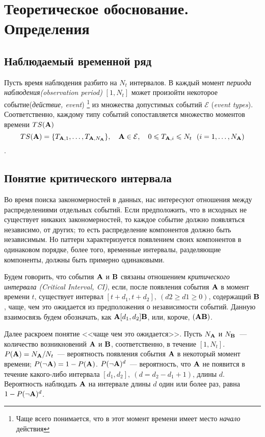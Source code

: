 \section{Теоретическое обоснование. Определения}
  \subsection{Наблюдаемый временной ряд}
Пусть время наблюдения разбито на $N_t$ интервалов. В каждый момент {\itshape периода наблюдения(observation period)} $[1,N_t]$ 
может произойти некоторое 
событие({\itshape действие, event}) \footnote{ Чаще всего понимается, что в этот момент времени имеет место {\itshape начало} действия} из 
множества допустимых событий $\mathcal{E}$ ({\itshape event types}). Соответственно, каждому типу событий сопоставляется множество моментов 
времени $TS({\bf A})$
$$TS({\bf A}) = \{T_{{\bf A},1},\dots, T_{{\bf A},N_{{\bf A}}}\},~~~ {\bf A}\in\mathcal{E},~~~ 0\leqslant T_{{\bf A},i}\leqslant N_t~~ (i=1,\dots,N_{{\bf A}})$$.
  \subsection{Понятие критического интервала}
Во время поиска закономерностей в данных, нас интересуют отношения между распределениями отдельных событий. Если предположить, что в исходных
не существует никаких закономерностей, то каждое событие должно появляться независимо, от других; то есть распределение компонентов должно быть 
независимым. Но паттерн характеризуется 
появлением своих компонентов в одинаковом порядке, более того, временные интервалы, разделяющие компоненты, должны быть примерно одинаковыми.

Будем говорить, что события ${\bf A}$ и ${\bf B}$ связаны отношением {\itshape критического интервала (Critical Interval, CI)}, если, после появления 
события ${\bf A}$ в момент времени $t$, существует интервал $[t+d_1,t+d_2],\ (d2\geqslant d1\geqslant0)$, содержащий ${\bf B}$, чаще, 
чем это ожидается из предположения о независимости событий. Данную взаимосвязь будем обозначать, как ${\bf A}[d_1, d_2]{\bf B}$, 
или, короче, $({\bf A}{\bf B})$.

Далее раскроем понятие <<чаще чем это ожидается>>. Пусть $N_{{\bf A}}$ и $N_{{\bf B}}$~--- количество возникновений ${\bf A}$ и ${\bf B}$, соответственно, 
в течение $[1,N_t]$. $P({\bf A})=N_{{\bf A}}/N_t$~--- вероятность появления события ${\bf A}$ в некоторый момент времени; 
$P(\neg{\bf A})=1-P({\bf A})$.
$P(\neg{\bf A})^d$~--- вероятность, что ${\bf A}$ не появится в течение какого-либо интервала $[d_1,d_2],~(d=d_2-d_1+1)$, длины $d$. 
Вероятность наблюдать ${\bf A}$ на
интервале длины $d$ один или более раз, равна $1-P(\neg{\bf A})^d$. 


